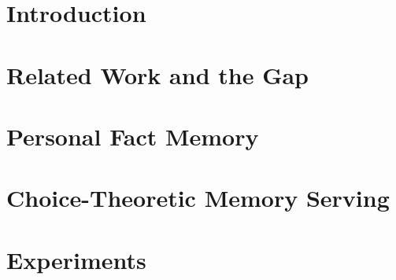 \documentclass[letterpaper]{article}
\begin{document}

\section{Introduction}

\section{Related Work and the Gap}

\section{Personal Fact Memory}

\section{Choice-Theoretic Memory Serving}

\section{Experiments}
\end{document}
